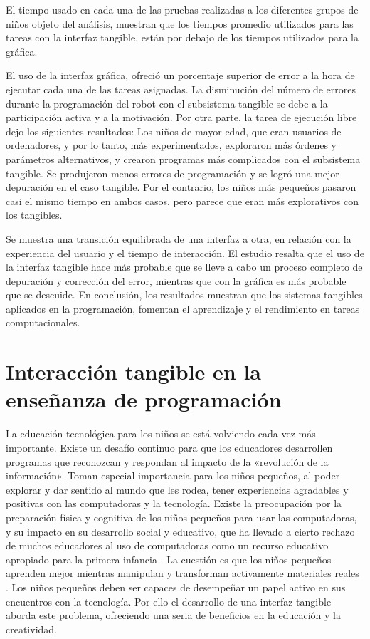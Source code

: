 El tiempo usado en cada una de las pruebas realizadas a los diferentes grupos de niños objeto del análisis, muestran que los tiempos promedio utilizados para las tareas con la interfaz tangible, están por debajo de los tiempos utilizados para la gráfica.

El uso de la interfaz gráfica, ofreció un porcentaje superior de error a la hora de ejecutar cada una de las tareas asignadas. La disminución del número de errores durante la programación del robot con el subsistema tangible se debe a la participación activa y a la motivación.
Por otra parte, la tarea de ejecución libre dejo los siguientes resultados:
Los niños de mayor edad, que eran usuarios de ordenadores, y por lo tanto, más experimentados, exploraron más órdenes y parámetros alternativos, y crearon programas más complicados con el subsistema tangible. Se produjeron menos errores de programación y se logró una mejor depuración en el caso tangible.
Por el contrario, los niños más pequeños pasaron casi el mismo tiempo en ambos casos, pero parece que eran más explorativos con los tangibles.

Se muestra una transición equilibrada de una interfaz a otra, en relación con la experiencia del usuario y el tiempo de interacción.
El estudio resalta que el uso de la interfaz tangible hace más probable que se lleve a cabo un proceso completo de depuración y corrección del error, mientras que con la gráfica es más probable que se descuide.
En conclusión, los resultados muestran que los sistemas tangibles aplicados en la programación, fomentan el aprendizaje y el rendimiento en tareas computacionales.


\section{Interacción tangible en la enseñanza de programación}

La educación tecnológica para los niños se está volviendo cada vez más importante. Existe un desafío continuo para que los educadores desarrollen programas que reconozcan y respondan al impacto de la «revolución de la información». Toman especial importancia para los niños pequeños, al poder explorar y dar sentido al mundo que les rodea, tener experiencias agradables y positivas con las computadoras y la tecnología. Existe la preocupación por la preparación física y cognitiva de los niños pequeños para usar las computadoras, y su impacto en su desarrollo social y educativo, que ha llevado a cierto rechazo de muchos educadores al uso de computadoras como un recurso educativo apropiado para la primera infancia \cite{Bailey}.
La cuestión es que los niños pequeños aprenden mejor mientras manipulan y transforman activamente materiales reales \cite{Beaty}.
Los niños pequeños deben ser capaces de desempeñar un papel activo en sus encuentros con la tecnología. Por ello el desarrollo de una interfaz tangible aborda este problema, ofreciendo una seria de beneficios en la educación y la creatividad. 

